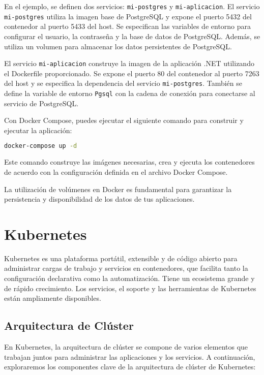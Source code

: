 \documentclass{article}
\begin{document}
En el ejemplo, se definen dos servicios: \lstinline{mi-postgres} y \lstinline{mi-aplicacion}. El servicio \lstinline{mi-postgres} utiliza la imagen base de PostgreSQL y expone el puerto 5432 del contenedor al puerto 5433 del host. Se especifican las variables de entorno para configurar el usuario, la contraseña y la base de datos de PostgreSQL. Además, se utiliza un volumen para almacenar los datos persistentes de PostgreSQL.

El servicio \lstinline{mi-aplicacion} construye la imagen de la aplicación .NET utilizando el Dockerfile proporcionado. Se expone el puerto 80 del contenedor al puerto 7263 del host y se especifica la dependencia del servicio \lstinline{mi-postgres}. También se define la variable de entorno \lstinline{Pgsql} con la cadena de conexión para conectarse al servicio de PostgreSQL.

Con Docker Compose, puedes ejecutar el siguiente comando para construir y ejecutar la aplicación:

\begin{lstlisting}[language=bash]
docker-compose up -d
\end{lstlisting}

Este comando construye las imágenes necesarias, crea y ejecuta los contenedores de acuerdo con la configuración definida en el archivo Docker Compose.

La utilización de volúmenes en Docker es fundamental para garantizar la persistencia y disponibilidad de los datos de tus aplicaciones. 

\newpage
\section{Kubernetes}

Kubernetes es una plataforma portátil, extensible y de código abierto para administrar cargas de trabajo y servicios en contenedores, que facilita tanto la configuración declarativa como la automatización. Tiene un ecosistema grande y de rápido crecimiento. Los servicios, el soporte y las herramientas de Kubernetes están ampliamente disponibles.

\subsection{Arquitectura de Clúster}

En Kubernetes, la arquitectura de clúster se compone de varios elementos que trabajan juntos para administrar las aplicaciones y los servicios. A continuación, exploraremos los componentes clave de la arquitectura de clúster de Kubernetes:
\end{document}

